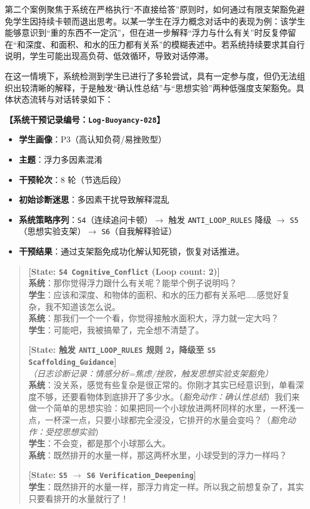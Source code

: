 第二个案例聚焦于系统在严格执行“不直接给答”原则时，如何通过有限支架豁免避免学生因持续卡顿而退出思考。以某一学生在浮力概念对话中的表现为例：该学生能够意识到“重的东西不一定沉”，但在进一步解释“浮力与什么有关”时反复停留在“和深度、和面积、和水的压力都有关系”的模糊表述中。若系统持续要求其自行说明，学生可能出现高负荷、低效循环，导致对话停滞。

在这一情境下，系统检测到学生已进行了多轮尝试，具有一定参与度，但仍无法组织出较清晰的解释，于是触发“确认性总结”与“思想实验”两种低强度支架豁免。具体状态流转与对话转录如下：

\textbf{【系统干预记录编号：\texttt{Log-Buoyancy-028}】}
\begin{itemize}
    \item \textbf{学生画像}：P3（高认知负荷/易挫败型）
    \item \textbf{主题}：浮力多因素混淆
    \item \textbf{干预轮次}：8 轮（节选后段）
    \item \textbf{初始诊断迷思}：多因素干扰导致解释混乱
    \item \textbf{系统策略序列}：\texttt{S4}（连续追问卡顿）$\rightarrow$ 触发 \texttt{ANTI\_LOOP\_RULES} 降级 $\rightarrow$ \texttt{S5}（思想实验支架）$\rightarrow$ \texttt{S6}（自我解释验证）
    \item \textbf{干预结果}：通过支架豁免成功化解认知死锁，恢复对话推进。
\end{itemize}

\begin{quote}
\textbf{[State: \texttt{S4 Cognitive\_Conflict} (Loop count: 2)]} \\
\textbf{系统}：那你觉得浮力跟什么有关呢？能举个例子说明吗？ \\
\textbf{学生}：应该和深度、和物体的面积、和水的压力都有关系吧……感觉好复杂，我不知道该怎么说。 \\
\textbf{系统}：那我们一个一个看，你觉得接触水面积大，浮力就一定大吗？ \\
\textbf{学生}：可能吧，我被搞晕了，完全想不清楚了。

\textbf{[State: 触发 \texttt{ANTI\_LOOP\_RULES} 规则 2，降级至 \texttt{S5 Scaffolding\_Guidance}]} \\
\textit{（日志诊断记录：情感分析=焦虑/挫败，触发思想实验支架豁免）} \\
\textbf{系统}：没关系，感觉有些复杂是很正常的。你刚才其实已经意识到，单看深度不够，还要看物体到底排开了多少水。（\textit{豁免动作：确认性总结}）我们来做一个简单的思想实验：如果把同一个小球放进两杯同样的水里，一杯浅一点，一杯深一点，只要小球都完全浸没，它排开的水量会变吗？（\textit{豁免动作：受控思想实验}） \\
\textbf{学生}：不会变，都是那个小球那么大。 \\
\textbf{系统}：既然排开的水量一样，那这两杯水里，小球受到的浮力一样吗？

\textbf{[State: \texttt{S5} $\rightarrow$ \texttt{S6 Verification\_Deepening}]} \\
\textbf{学生}：既然排开的水量一样，那浮力肯定一样。所以我之前想复杂了，其实只要看排开的水量就行了！
\end{quote}


